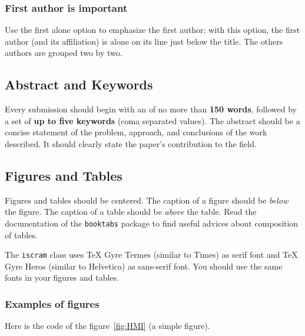 \documentclass[]{iscram}
\newcommand\macro[1]{{\textcolor{macro color}{\ttfamily\bfseries\string#1}}}
\newcommand\option[1]{\textcolor{option color}{\ttfamily#1}}
\begin{document}
\subsubsection{First author is important}

Use the \option{first alone} option to emphasize the first author: with
this option, the first author (and its affiliation) is alone on its line
just below the title. The others authors are grouped two by two.

\subsection{Abstract and Keywords}

Every submission should begin with an \macro{\abstract} of no more than
\textbf{150 words}, followed by a set of \textbf{up to five keywords}
(coma separated values). The abstract should be a concise statement of
the problem, approach, and conclusions of the work described. It should
clearly state the paper's contribution to the field.

\subsection{Figures and Tables}

Figures and tables should be centered. The caption of a figure should be
\emph{below} the figure. The caption of a table should be \emph{above}
the table. Read the documentation of the \texttt{booktabs} package to
find useful advices about composition of tables.

The \texttt{iscram} class uses TeX Gyre Termes (similar to Times) as
serif font and TeX Gyre Heros (similar to Helvetica) as sans-serif
font. You should use the same fonts in your figures and tables.

\subsubsection{Examples of figures}

Here is the code of the figure~\ref{fig:HMI} (a simple figure).
\end{document}
